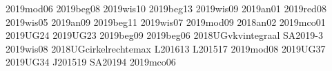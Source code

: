2019mod06
2019beg08
2019wis10
2019beg13
2019wis09
2019an01
2019red08
2019wis05
2019an09
2019beg11
2019wis07
2019mod09
2018an02
2019mco01
2019UG24
2019UG23
2019beg09
2019beg06
2018UGvkvintegraal
SA2019-3
2019wis08
2018UGcirkelrechtemax
L201613
L201517
2019mod08
2019UG37
2019UG34
J201519
SA20194
2019mco06

